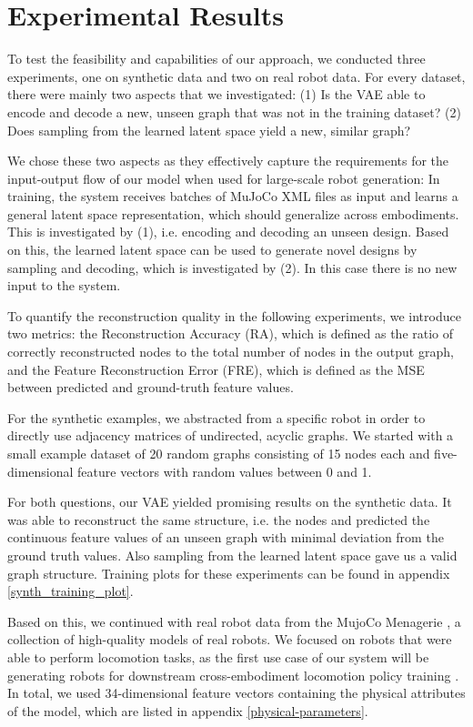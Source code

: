 \documentclass{article}
\theoremstyle{plain}
\theoremstyle{definition}
\theoremstyle{remark}
\begin{document}
\section{Experimental Results}
To test the feasibility and capabilities of our approach, we conducted three experiments, one on synthetic data and two on real robot data. For every dataset, there were mainly two aspects that we investigated: (1) Is the VAE able to encode and decode a new, unseen graph that was not in the training dataset? (2) Does sampling from the learned latent space yield a new, similar graph? 

We chose these two aspects as they effectively capture the requirements for the input-output flow of our model when used for large-scale robot generation: In training, the system receives batches of MuJoCo XML files as input and learns a general latent space representation, which should generalize across embodiments. This is investigated by (1), i.e. encoding and decoding an unseen design. Based on this, the learned latent space can be used to generate novel designs by sampling and decoding, which is investigated by (2). In this case there is no new input to the system. 

To quantify the reconstruction quality in the following experiments, we introduce two metrics: the Reconstruction Accuracy (RA), which is defined as the ratio of correctly reconstructed nodes to the total number of nodes in the output graph, and the Feature Reconstruction Error (FRE), which is defined as the MSE between predicted and ground-truth feature values.

For the synthetic examples, we abstracted from a specific robot in order to directly use adjacency matrices of undirected, acyclic graphs. We started with a small example dataset of 20 random graphs consisting of 15 nodes each and five-dimensional feature vectors with random values between 0 and 1. 

For both questions, our VAE yielded promising results on the synthetic data. It was able to reconstruct the same structure, i.e. the nodes and predicted the continuous feature values of an unseen graph with minimal deviation from the ground truth values. Also sampling from the learned latent space gave us a valid graph structure. Training plots for these experiments can be found in appendix \ref{synth_training_plot}.

Based on this, we continued with real robot data from the MujoCo Menagerie \cite{menagerie2022github}, a collection of high-quality models of real robots. We focused on robots that were able to perform locomotion tasks, as the first use case of our system will be generating robots for downstream cross-embodiment locomotion policy training \cite{bohlinger2024one, ai2025towards}. In total, we used 34-dimensional feature vectors containing the physical attributes of the model, which are listed in appendix \ref{physical-parameters}.
\end{document}
